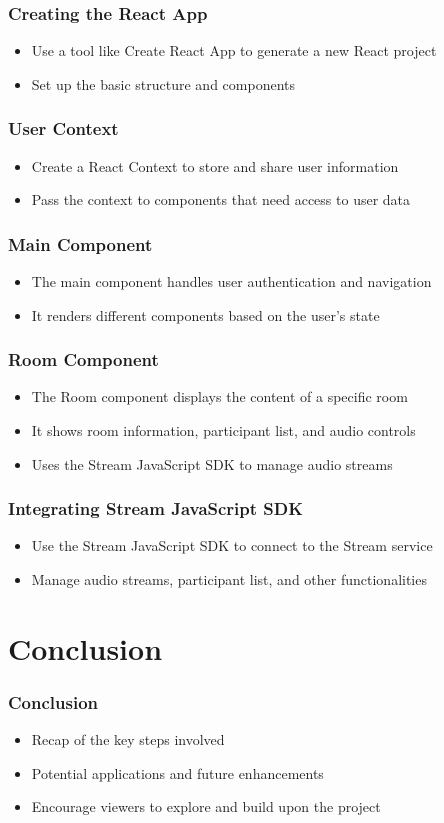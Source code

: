 \documentclass{beamer}
\begin{document}
\begin{frame}
    \frametitle{Creating the React App}
    \begin{itemize}
        \item Use a tool like Create React App to generate a new React project
        \item Set up the basic structure and components
    \end{itemize}
\end{frame}

\begin{frame}
    \frametitle{User Context}
    \begin{itemize}
        \item Create a React Context to store and share user information
        \item Pass the context to components that need access to user data
    \end{itemize}
\end{frame}

\begin{frame}
    \frametitle{Main Component}
    \begin{itemize}
        \item The main component handles user authentication and navigation
        \item It renders different components based on the user's state
    \end{itemize}
\end{frame}

\begin{frame}
    \frametitle{Room Component}
    \begin{itemize}
        \item The Room component displays the content of a specific room
        \item It shows room information, participant list, and audio controls
        \item Uses the Stream JavaScript SDK to manage audio streams
    \end{itemize}
\end{frame}

\begin{frame}
    \frametitle{Integrating Stream JavaScript SDK}
    \begin{itemize}
        \item Use the Stream JavaScript SDK to connect to the Stream service
        \item Manage audio streams, participant list, and other functionalities
    \end{itemize}
\end{frame}

\section{Conclusion}

\begin{frame}
    \frametitle{Conclusion}
    \begin{itemize}
        \item Recap of the key steps involved
        \item Potential applications and future enhancements
        \item Encourage viewers to explore and build upon the project
    \end{itemize}
\end{frame}
\end{document}
